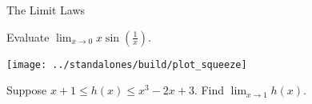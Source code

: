 \documentclass[../main.tex]{subfiles}
\begin{document}
\begin{lesson}{The Limit Laws}
\begin{mdframed}[style=withref]
  \end{mdframed}

  \begin{example}
    Evaluate \(\lim_{x \to 0} x \sin\left(\frac{1}{x}\right)\).

    \hfill\texttt{[image: ../standalones/build/plot\_squeeze]}
  \end{example}
  \clearpage

  \begin{example}
    Suppose \(x+1 \le h(x) \le x^{3} - 2x + 3\). Find \(\lim_{x \to 1} h(x)\).

  \end{example}
\end{lesson}
\end{document}
